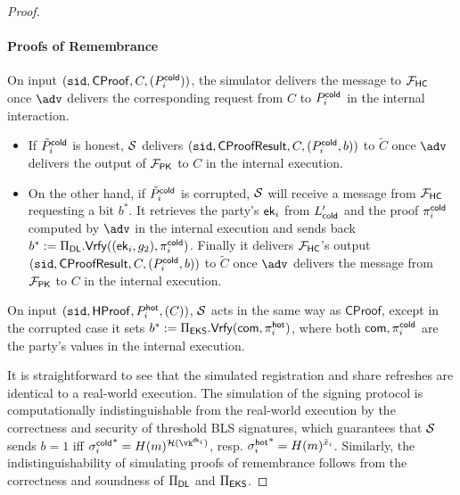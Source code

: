 \begin{proof}
\paragraph{Proofs of Remembrance}
On input $(\texttt{sid}, \mathsf{CProof}, C, (P_i^{\mathsf{cold}}))$, the simulator delivers the message to $\mathcal{F}_\mathsf{HC}$ once $\adv$ delivers the corresponding request from $C$ to $P_i^{\mathsf{cold}}$ in the internal interaction. 
\begin{itemize}
    \item If $\tilde{P}_i^{\mathsf{cold}}$ is honest, $\mathcal{S}$ delivers $(\texttt{sid}, \mathsf{CProofResult}, C,\allowbreak (P_i^{\mathsf{cold}}, b))$ to $\tilde{C}$ once $\adv$ delivers the output of $\mathcal{F}_\mathsf{PK}$ to $C$ in the internal execution. 
    \item On the other hand, if $\tilde{P}_i^{\mathsf{cold}}$ is corrupted, $\mathcal{S}$ will receive a message from $\mathcal{F}_\mathsf{HC}$ requesting a bit $b^*$. It retrieves the party's $\mathsf{ek}_i$ from $L_{\mathsf{cold}}'$ and the proof $\pi_i^{\mathsf{cold}}$ computed by $\adv$ in the internal execution and sends back $b^* := \Pi_{\sf DL}.\mathsf{Vrfy}((\mathsf{ek}_i,\allowbreak g_2), {\pi_i^{\mathsf{cold}}})$. Finally it delivers $\mathcal{F}_\mathsf{HC}$'s output $(\texttt{sid}, \mathsf{CProofResult},\allowbreak C, (P_i^{\mathsf{cold}}, b))$ to $\tilde{C}$ once $\adv$ delivers the message from $\mathcal{F}_\mathsf{PK}$ to $C$ in the internal execution.
\end{itemize}
On input $(\texttt{sid}, \mathsf{HProof}, P_i^{\mathsf{hot}}, (C))$, $\mathcal{S}$ acts in the same way as $\mathsf{CProof}$, except in the corrupted case it sets $b^* := \Pi_{\sf EKS}.\mathsf{Vrfy}(\mathsf{com}, {\pi_i^{\mathsf{hot}}})$, where both $\mathsf{com}, \pi_i^{\mathsf{cold}}$ are the party's values in the internal execution.

It is straightforward to see that the simulated registration and share refreshes are identical to a real-world execution.
The simulation of the signing protocol is computationally indistinguishable from the real-world execution by the correctness and security of threshold BLS signatures, which guarantees that $\mathcal{S}$ sends $b=1$ iff ${\sigma_i^\cold}^* = \blshash(m)^{\lhlhash(\vk^{\dk_i})}$, resp. ${\sigma_i^{\mathsf{hot}}}^* = H(m)^{\tilde{x}_i}$. 
Similarly, the indistinguishability of simulating proofs of remembrance follows from the correctness and soundness of $\Pi_{\sf DL}$ and $\Pi_{\sf EKS}$.
\end{proof}

